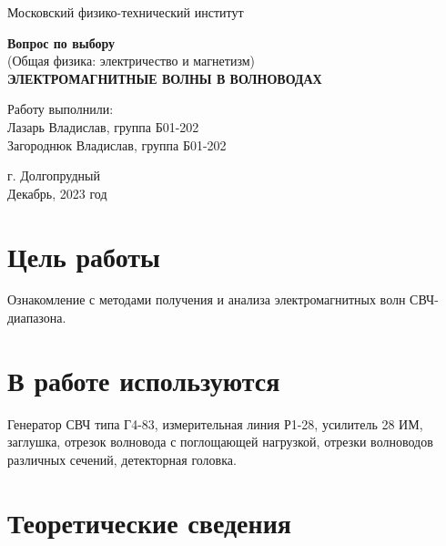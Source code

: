 \documentclass[a4paper,12pt]{article}
\date{}
\begin{document}
\begin{titlepage}
	\begin{center}
		\large 	Московский физико-технический институт \\
		\vspace{0.2cm}

		\vspace{4.5cm}
		\LARGE \textbf{Вопрос по выбору} \\ \vspace{0.2cm}
		\large (Общая физика: электричество и магнетизм) \\ \vspace{0.2cm}
		\LARGE \textbf{ЭЛЕКТРОМАГНИТНЫЕ ВОЛНЫ В
ВОЛНОВОДАХ}
	\end{center}
	\vspace{2.3cm} \large

	\begin{center}
		Работу выполнили: \\
        Лазарь Владислав, группа Б01-202\\
        Загороднюк Владислав, группа Б01-202\\
	\end{center}
	\begin{center} \vspace{90mm}
		г. Долгопрудный \\
		 Декабрь, 2023 год
	\end{center}
\end{titlepage}

\section*{Цель работы}
Ознакомление с методами получения и анализа электромагнитных волн СВЧ-диапазона.

\section*{В работе используются}
Генератор СВЧ типа Г4-83, измерительная линия Р1-28, усилитель 28 ИМ, заглушка, отрезок волновода с поглощающей нагрузкой, отрезки волноводов различных сечений, детекторная головка.

\section*{Теоретические сведения}
\end{document}
